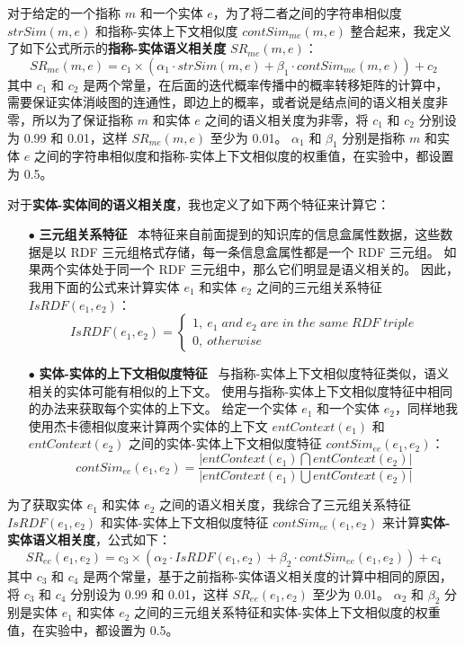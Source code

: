 对于给定的一个指称 $m$ 和一个实体 $e$，为了将二者之间的字符串相似度 $strSim(m,e)$ 和指称-实体上下文相似度 $contSim_{me}(m,e)$ 整合起来，我定义了如下公式所示的\textbf{指称-实体语义相关度} $SR_{me}(m,e)$：
\begin{equation}
SR_{me}(m,e)=c_1\times(\alpha_1 \cdot strSim(m,e) + \beta_1 \cdot contSim_{me}(m,e)) + c_2
\label{equation_srme}
\end{equation}
其中 $c_1$ 和 $c_2$ 是两个常量，在后面的迭代概率传播中的概率转移矩阵的计算中，需要保证实体消岐图的连通性，即边上的概率，或者说是结点间的语义相关度非零，所以为了保证指称 $m$ 和实体 $e$ 之间的语义相关度为非零，将 $c_1$ 和 $c_2$ 分别设为 0.99 和 0.01，这样 $SR_{me}(m,e)$ 至少为 0.01。
$\alpha_1$ 和 $\beta_1$ 分别是指称 $m$ 和实体 $e$ 之间的字符串相似度和指称-实体上下文相似度的权重值，在实验中，都设置为 0.5。
\newline

对于\textbf{实体-实体间的语义相关度}，我也定义了如下两个特征来计算它：
\begin{itemize}
	\item[$\bullet$] \textbf{三元组关系特征} \ 
	本特征来自前面提到的知识库的信息盒属性数据，这些数据是以 RDF 三元组格式存储，每一条信息盒属性都是一个 RDF 三元组。
	如果两个实体处于同一个 RDF 三元组中，那么它们明显是语义相关的。
	因此，我用下面的公式来计算实体 $e_1$ 和实体 $e_2$ 之间的三元组关系特征 $IsRDF(e_1,e_2)$：
	\begin{equation}
  	IsRDF(e_1,e_2)=
  		\left\{ 
      	\begin{array}{l}
      	1,\ e_1\;and\;e_2\;are\;in\;the\;same\;RDF\;triple\\
      	0,\ otherwise
      \end{array} 
  	\right.
  	\end{equation}
    \item[$\bullet$] \textbf{实体-实体的上下文相似度特征} \ 
  	与指称-实体上下文相似度特征类似，语义相关的实体可能有相似的上下文。
  	使用与指称-实体上下文相似度特征中相同的办法来获取每个实体的上下文。
  	给定一个实体 $e_1$ 和一个实体 $e_2$，同样地我使用杰卡德相似度来计算两个实体的上下文 $entContext(e_1)$ 和 $entContext(e_2)$ 之间的实体-实体上下文相似度特征 $contSim_{ee}(e_1, e_2)$：
  	\begin{equation}
		contSim_{ee}(e_1,e_2)=\frac{|entContext(e_1)\bigcap{entContext(e_2)}|}{|entContext(e_1)\bigcup{entContext(e_2)}|}
	\label{contsim}
  	\end{equation}
\end{itemize}
为了获取实体 $e_1$ 和实体 $e_2$ 之间的语义相关度，我综合了三元组关系特征 $IsRDF(e_1,e_2)$ 和实体-实体上下文相似度特征 $contSim_{ee}(e_1, e_2)$ 来计算\textbf{实体-实体语义相关度}，公式如下：
\begin{equation}
SR_{ee}(e_1,e_2)=c_3\times(\alpha_2 \cdot IsRDF(e_1,e_2) + \beta_2 \cdot contSim_{ee}(e_1,e_2)) + c_4
\label{equation_sree}
\end{equation}
其中 $c_3$ 和 $c_4$ 是两个常量，基于之前指称-实体语义相关度的计算中相同的原因，将 $c_3$ 和 $c_4$ 分别设为 0.99 和 0.01，这样 $SR_{ee}(e_1,e_2)$ 至少为 0.01。
$\alpha_2$ 和 $\beta_2$ 分别是实体 $e_1$ 和实体 $e_2$ 之间的三元组关系特征和实体-实体上下文相似度的权重值，在实验中，都设置为 0.5。
\newline

